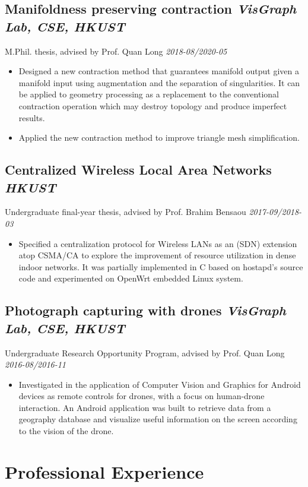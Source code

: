\documentclass[11pt]{article}
\newcommand{\subsec}[2]{\subsection*{#1 \hfill {\normalfont\itshape #2}}}
\newcommand{\subsecdesc}[2]{{#1 \hfill \itshape #2}}
\begin{document}
  \subsec{Manifoldness preserving contraction}
         {VisGraph Lab, CSE, HKUST}
  \subsecdesc{M.Phil. thesis, advised by Prof. Quan Long}
             {2018-08/2020-05}
  \begin{itemize}
    \item Designed a new contraction method that guarantees manifold output
      given a manifold input using augmentation and the separation of
      singularities. It can be applied to geometry processing as a replacement
      to the conventional contraction operation which may destroy topology and
      produce imperfect results.
    \item Applied the new contraction method to improve triangle mesh
      simplification.
  \end{itemize}

  \subsec{Centralized Wireless Local Area Networks}
         {HKUST}
  \subsecdesc{Undergraduate final-year thesis, advised by Prof. Brahim Bensaou}
             {2017-09/2018-03}
  \begin{itemize}
    \item Specified a centralization protocol for Wireless LANs as an
      (SDN) extension atop CSMA/CA to explore the
      improvement of resource utilization in dense indoor networks. It was
      partially implemented in C based on hostapd's source code and experimented
      on OpenWrt embedded Linux system.
  \end{itemize}

\ifdefined{}
  \subsec{Photograph capturing with drones}
         {VisGraph Lab, CSE, HKUST}
  \subsecdesc{Undergraduate Research Opportunity Program, advised by Prof. Quan Long}
             {2016-08/2016-11}
  \begin{itemize}
    \item Investigated in the application of Computer Vision and Graphics for
      Android devices as remote controls for drones, with a focus on human-drone
      interaction. An Android application was built to retrieve data from a
      geography database and visualize useful information on the screen
      according to the vision of the drone.
  \end{itemize}
\fi

\section*{Professional Experience} %
\end{document}
